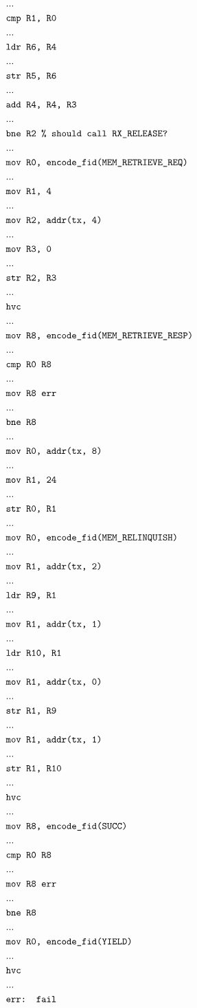 \documentclass{article}
\begin{document}
\begin{align*}
  &{
  ...
  }\\&\texttt{{cmp R1, R0}}\\
  &{
  ...
  }\\&\texttt{{ldr R6, R4}}\\
  &{
  ...
  }\\&\texttt{{str R5, R6}}\\
  &{
  ...
  }\\&\texttt{{add R4, R4, R3}}\\
  &{
  ...
  }\\&\texttt{{bne R2 \% should call RX\_RELEASE?}}\\
  &{
  ...
  }\\&\texttt{{mov R0, encode\_fid(MEM\_RETRIEVE\_REQ)}}\\
  &{
  ...
  }\\&\texttt{{mov R1, 4}}\\
  &{
  ...
  }\\&\texttt{{mov R2, addr(tx, 4)}}\\
  &{
  ...
  }\\&\texttt{{mov R3, 0}}\\
  &{
  ...
  }\\&\texttt{{str R2, R3}}\\
  &{
  ...
  }\\&\texttt{{hvc}}\\
  &{
  ...
  }\\&\texttt{{mov R8, encode\_fid(MEM\_RETRIEVE\_RESP)}}\\
  &{
  ...
  }\\&\texttt{{cmp R0 R8}}\\
  &{
  ...
  }\\&\texttt{{mov R8 err}}\\
  &{
  ...
  }\\&\texttt{{bne R8}}\\
  &{
  ...
  }\\&\texttt{{mov R0, addr(tx, 8)}}\\
  &{
  ...
  }\\&\texttt{{mov R1, 24}}\\
  &{
  ...
  }\\&\texttt{{str R0, R1}}\\
  &{
  ...
  }\\&\texttt{{mov R0, encode\_fid(MEM\_RELINQUISH)}}\\
  &{
  ...
  }\\&\texttt{{mov R1, addr(tx, 2)}}\\
  &{
  ...
  }\\&\texttt{{ldr R9, R1}}\\
  &{
  ...
  }\\&\texttt{{mov R1, addr(tx, 1)}}\\
  &{
  ...
  }\\&\texttt{{ldr R10, R1}}\\
  &{
  ...
  }\\&\texttt{{mov R1, addr(tx, 0)}}\\
  &{
  ...
  }\\&\texttt{{str R1, R9}}\\
  &{
  ...
  }\\&\texttt{{mov R1, addr(tx, 1)}}\\
   &{
  ...
  }\\&\texttt{{str R1, R10}}\\
  &{
  ...
  }\\&\texttt{{hvc}}\\
  &{
  ...
  }\\&\texttt{{mov R8, encode\_fid(SUCC)}}\\
  &{
  ...
  }\\&\texttt{{cmp R0 R8}}\\
  &{
  ...
  }\\&\texttt{{mov R8 err}}\\
  &{
  ...
  }\\&\texttt{{bne R8}}\\
  &{
  ...
  }\\&\texttt{{mov R0, encode\_fid(YIELD)}}\\
  &{
  ...
  }\\&\texttt{{hvc}}\\
  &{
  ...
  }\\&\texttt{{err: fail}}\\
  \end{align*}
\end{document}

